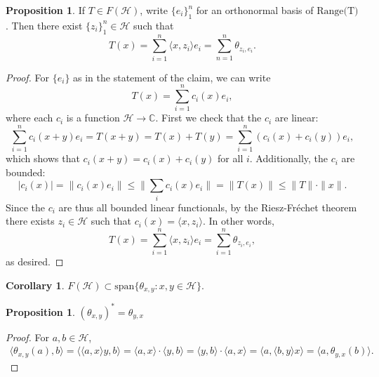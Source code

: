 \documentclass{dcthesis}
\numberwithin{equation}{section}
\numberwithin{equation}{section}
\theoremstyle{definition}
\newtheorem{proposition}[equation]{Proposition}
\newtheorem{corollary}[equation]{Corollary}
\begin{document}
\begin{proposition}
\label{prop_finite_rank_as_theta}
	If $T\in F(\mathcal{H})$, write $\{e_i\}_1^n$ for an orthonormal basis of $\text{Range(T)}$. Then there exist $\{z_i\}_1^n\in\mathcal{H}$ such that 
	\begin{equation*}
		T(x)=\sum_{i=1}^n\langle x, z_i\rangle e_i = \sum_{n=1}^n \theta_{z_i,e_i}.
	\end{equation*}
\end{proposition}
\begin{proof}
	For $\{e_i\}$ as in the statement of the claim, we can write
	\begin{equation*}
		T(x) = \sum_{i=1}^n c_i(x)e_i,
	\end{equation*}
	where each $c_i$ is a function $\mathcal{H}\to \mathbb{C}$. First we check that the $c_i$ are linear:
	\begin{equation*}
		\sum_{i=1}^n c_i(x+y)e_i = T(x+y) = T(x) + T(y) = \sum_{i=1}^n (c_i(x)+c_i(y))e_i,
	\end{equation*}
	which shows that $c_i(x+y)=c_i(x)+c_i(y)$ for all $i$. Additionally, the $c_i$ are bounded:
	\begin{equation*}
		|c_i(x)|=\|c_i(x)e_i\|\leq\|\sum_{i}c_i(x)e_i\|=\|T(x)\|\leq \|T\|\cdot\|x\|.
	\end{equation*}	
	Since the $c_i$ are thus all bounded linear functionals, by the Riesz-Fr\'echet theorem there exists $z_i\in \mathcal{H}$ such that $c_i(x)=\langle x,z_i\rangle$. In other words,
	\begin{equation*}
		T(x)= \sum_{i=1}^n \langle x, z_i\rangle e_i=\sum_{i=1}^n \theta_{z_i, e_i},
	\end{equation*}
	as desired.
\end{proof}

\begin{corollary}
	$F(\mathcal{H})\subset\text{span}\{\theta_{x,y} : x,y\in\mathcal{H}\}$.
\end{corollary}

\begin{proposition}
\label{prop_theta_adjoint}
	$(\theta_{x,y})^\ast = \theta_{y,x}$
\end{proposition}
\begin{proof}
	For $a,b\in \mathcal{H}$, 
\begin{gather*}
	\langle \theta_{x,y}(a), b\rangle = \langle \langle a, x\rangle y, b\rangle = \langle a,x\rangle\cdot\langle y,b\rangle = \langle y,b\rangle\cdot\langle a, x\rangle = \langle a, \langle b,y\rangle x\rangle = \langle a, \theta_{y,x}(b)\rangle.
\end{gather*}
\end{proof}
\end{document}
